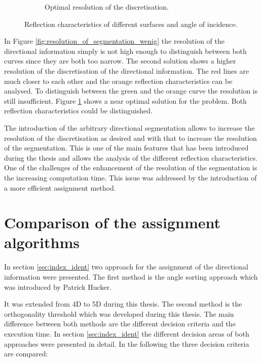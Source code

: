 \begin{figure}[H]
\begin{subfigure}[b]{0.32\textwidth}
         \caption{Optimal resolution of the discretisation.}
         \label{fig:resolution_of_segmentation_gut}
     \end{subfigure}
        \caption{Reflection characteristics of different surfaces and angle of incidence.}
        \label{fig:resolution_of_segmentation}
\end{figure}


In Figure \ref{fig:resolution_of_segmentation_wenig} the resolution of the directional information simply is not high enough to distinguish between both curves since they are both too narrow. The second solution shows a higher resolution of the discretisation of the directional information. The red lines are much closer to each other and the orange reflection characteristics can be analysed. To distinguish between the green and the orange curve the resolution is still insufficient. Figure \ref{fig:resolution_of_segmentation_gut} shows a near optimal solution for the problem. Both reflection characteristics could be distinguished. 

The introduction of the arbitrary directional segmentation allows to increase the resolution of the discretisation as desired and with that to increase the resolution of the segmentation. This is one of the main features that has been introduced during the thesis and allows the analysis of the different reflection characteristics. One of the challenges of the enhancement of the resolution of the segmentation is the increasing computation time. This issue was addressed by the introduction of a more efficient assignment method.






\section{Comparison of the assignment algorithms}
In section \ref{sec:index_ident} two approach for the assignment of the directional information were presented. The first method is the angle sorting approach which was introduced by Patrick Hucker.

It was extended from 4D to 5D during this thesis. The second method is the orthogonality threshold which was developed during this thesis. The main difference between both methods are the different decision criteria and the execution time. In section \ref{sec:index_ident} the different decision areas of both approaches were presented in detail. In the following the three decision criteria are compared:

